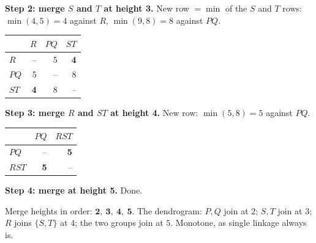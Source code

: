 \documentclass[11pt]{article}
\begin{document}
\textbf{Step 2: merge $S$ and $T$ at height 3.} New row $= \min$ of the $S$
and $T$ rows: $\min(4,5) = 4$ against $R$, $\min(9,8) = 8$ against $PQ$.
\begin{center}\small
\begin{tabular}{lrrr}
  \toprule
  & $R$ & $PQ$ & $ST$ \\
  \midrule
  $R$  & -- & 5 & \textbf{4} \\
  $PQ$ & 5  & --& 8 \\
  $ST$ & \textbf{4}  & 8 & -- \\
  \bottomrule
\end{tabular}
\end{center}

\textbf{Step 3: merge $R$ and $ST$ at height 4.} New row: $\min(5, 8) = 5$
against $PQ$.
\begin{center}\small
\begin{tabular}{lrr}
  \toprule
  & $PQ$ & $RST$ \\
  \midrule
  $PQ$  & -- & \textbf{5} \\
  $RST$ & \textbf{5}  & -- \\
  \bottomrule
\end{tabular}
\end{center}

\textbf{Step 4: merge at height 5.} Done.

Merge heights in order: $\mathbf{2,\ 3,\ 4,\ 5}$. The dendrogram: $P,Q$ join
at $2$; $S,T$ join at $3$; $R$ joins $\{S,T\}$ at $4$; the two groups join at
$5$. Monotone, as single linkage always is.
\end{document}
